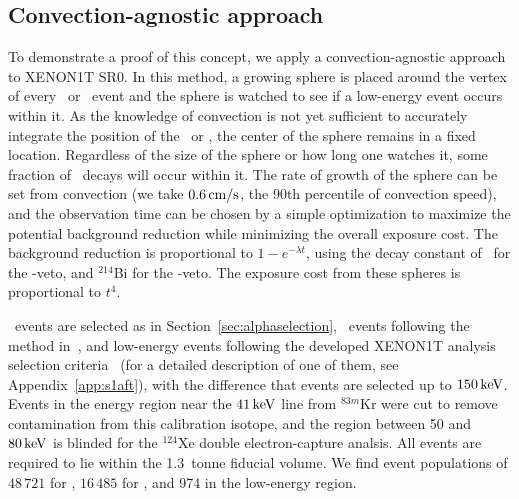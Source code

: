 \subsection{Convection-agnostic approach}

To demonstrate a proof of this concept, we apply a convection-agnostic approach to XENON1T SR0. In this method, a growing sphere is placed around the vertex of every \Po~or \BiPo~event and the sphere is watched to see if a low-energy event occurs within it. As the knowledge of convection is not yet sufficient to accurately integrate the position of the \Po~or \BiPo, the center of the sphere remains in a fixed location. Regardless of the size of the sphere or how long one watches it, some fraction of \Pb~decays will occur within it. The rate of growth of the sphere can be set from convection (we take $0.6\,\mathrm{cm/s}$, the 90th percentile of convection speed), and the observation time can be chosen by a simple optimization to maximize the potential background reduction while minimizing the overall exposure cost. The background reduction is proportional to $1-e^{-\lambda t}$, using the decay constant of \Pb~for the \Po-veto, and $^{214}$Bi for the \BiPo-veto. The exposure cost from these spheres is proportional to $t^4$.

\Po~events are selected as in Section~\ref{sec:alphaselection}, \BiPo~events following the method in~\cite{Aprile:2017fhu}, and low-energy events following the developed XENON1T analysis selection criteria~\cite{Aprile:2017iyp} (for a detailed description of one of them, see Appendix~\ref{app:s1aft}), with the difference that events are selected up to $150\,\mathrm{keV}$. Events in the energy region near the $41\,\mathrm{keV}$ line from $^{83m}$Kr were cut to remove contamination from this calibration isotope, and the region between 50 and $80\,\mathrm{keV}$ is blinded for the $^{124}$Xe double electron-capture analsis. All events are required to lie within the 1.3~tonne fiducial volume. We find event populations of $48\,721$ for \Po, $16\,485$ for \BiPo, and 974 in the low-energy region.

